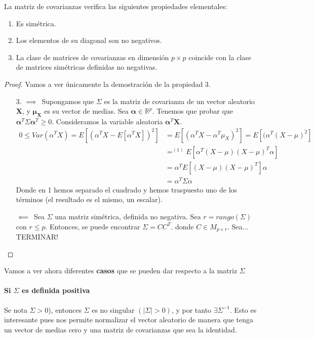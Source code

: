 \begin{nprop}
  La matriz de covarianzas verifica las siguientes propiedades elementales:
  \begin{enumerate}
    \item Es simétrica.
    \item Los elementos de su diagonal son no negativos.
    \item La clase de matrices de covarianzas en dimensión $p\times p$ coincide con la clase de matrices simétricas definidas no negativas.
    \end{enumerate}
  \end{nprop}
\begin{proof}
  Vamos a ver únicamente la demostración de la propiedad 3.
  \begin{itemize}
    \item[3.] $\boxed{\implies}\,$ Supongamos que $\Sigma$ es la matriz de covarianza de un vector aleatorio $\boldsymbol X$, y $\boldsymbol \mu_{\boldsymbol X}$ es su vector de medias. Sea $\boldsymbol \alpha \in \mathbb R^p$. Tenemos que probar que $\boldsymbol \alpha^T \Sigma \boldsymbol \alpha^T \geq 0$. Consideramos la variable aleatoria $\boldsymbol \alpha^T \boldsymbol X$. \begin{align*}
      0 \leq Var(\alpha^T X) = E[(\alpha^T X - E[\alpha^T X])^2] &= E[(\alpha^T X - \alpha^T \mu_X)^2] = E[(\alpha^T(X-\mu)^2]\\ 
        &=^{(1)} E[\alpha^T(X-\mu)(X-\mu)^T \alpha] \\
        &= \alpha^T E[(X-\mu)(X-\mu)^T] \alpha \\
        &= \alpha^T \Sigma \alpha
    \end{align*} Donde en 1 hemos separado el cuadrado y hemos traspuesto uno de los términos (el resultado es el mismo, un escalar).

  $\boxed{\impliedby}\,$ Sea $\Sigma$ una matriz simétrica, definida no negativa. Sea $r = rango(\Sigma)$ con $r\leq p$. Entonces, se puede encontrar $\Sigma = C C^T$. donde $C \in M_{p\times r}$. Sea... TERMINAR!

  \end{itemize}
\end{proof}

Vamos a ver ahora diferentes \textbf{casos} que se pueden dar respecto a la matriz $\Sigma$
\paragraph{Si $\Sigma$ es definida positiva} Se nota $\Sigma > 0$), entonces $\Sigma$ es no singular $(|\Sigma| > 0)$, y por tanto $\exists \Sigma^{-1}$. Esto es interesante pues nos permite normalizar el vector aleatorio de manera que tenga un vector de medias cero y una matriz de covarianzas que sea la identidad.\\

